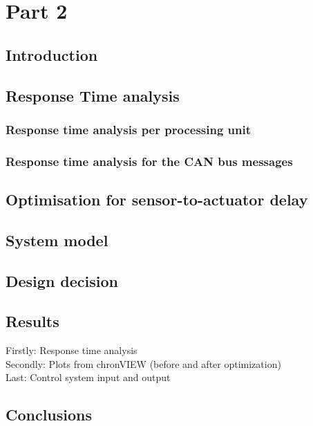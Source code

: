 \chapter{Part 2}


\section{Introduction}

\section{Response Time analysis}

\subsection{Response time analysis per processing unit}

\subsection{ Response time analysis for the CAN bus messages}

\section{Optimisation for sensor-to-actuator delay}

\section{System model}

\section{Design decision}

\section{Results}

Firstly: Response time analysis\\
Secondly: Plots from chronVIEW (before and after optimization)\\
Last: Control system input and output

\section{Conclusions}